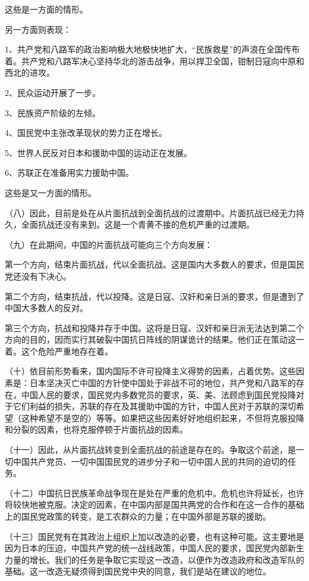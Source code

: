 这些是一方面的情形。

另一方面则表现：

1、共产党和八路军的政治影响极大地极快地扩大，“民族救星”的声浪在全国传布着。共产党和八路军决心坚持华北的游击战争，用以捍卫全国，钳制日寇向中原和西北的进攻。

2、民众运动开展了一步。

3、民族资产阶级的左倾。

4、国民党中主张改革现状的势力正在增长。

5、世界人民反对日本和援助中国的运动正在发展。

6、苏联正在准备用实力援助中国。

这些是又一方面的情形。

（八）因此，目前是处在从片面抗战到全面抗战的过渡期中。片面抗战已经无力持久，全面抗战还没有来到。这是一个青黄不接的危机严重的过渡期。

（九）在此期间，中国的片面抗战可能向三个方向发展：

第一个方向，结束片面抗战，代以全面抗战。这是国内大多数人的要求，但是国民党还没有下决心。

第二个方向，结束抗战，代以投降。这是日寇、汉奸和亲日派的要求，但是遭到了中国大多数人的反对。

第三个方向，抗战和投降并存于中国。这将是日寇、汉奸和亲日派无法达到第二个方向的目的，因而实行其破裂中国抗日阵线的阴谋诡计的结果。他们正在策动这一着。这个危险严重地存在着。

（十）依目前形势看来，国内国际不许可投降主义得势的因素，占着优势。这些因素是：日本坚决灭亡中国的方针使中国处于非战不可的地位，共产党和八路军的存在，中国人民的要求，国民党内多数党员的要求，英、美、法顾虑到国民党投降对于它们利益的损失，苏联的存在及其援助中国的方针，中国人民对于苏联的深切希望（这种希望不是空的）等等。如果把这些因素好好地组织起来，不但将克服投降和分裂的因素，也将克服停顿于片面抗战的因素。

（十一）因此，从片面抗战转变到全面抗战的前途是存在的。争取这个前途，是一切中国共产党员、一切中国国民党的进步分子和一切中国人民的共同的迫切的任务。

（十二）中国抗日民族革命战争现在是处在严重的危机中。危机也许将延长，也许将较快地被克服。决定的因素，在中国内部是国共两党的合作和在这一合作的基础上的国民党政策的转变，是工农群众的力量；在中国外部是苏联的援助。

（十三）国民党有在其政治上组织上加以改造的必要，也有这种可能。这主要地是因为日本的压迫，中国共产党的统一战线政策，中国人民的要求，国民党内部新生力量的增长。我们的任务是争取它实现这一改造，以便作为改造政府和改造军队的基础。这一改造无疑须得到国民党中央的同意，我们是站在建议的地位。


